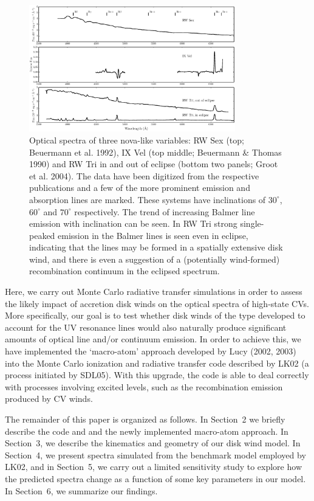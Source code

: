 \documentclass[preprint, a4paper, 11pt]{aastex}
\begin{document}
\begin{figure}	%
\centering
\includegraphics[width=0.8\textwidth]{figures/fig1.eps}
\caption{Optical spectra of three nova-like variables: 
RW Sex (top; Beuermann et al. 1992),
IX Vel (top middle; Beuermann \& Thomas 1990) 
and RW Tri in and out of eclipse (bottom two panels; Groot et al. 2004).
The data have been digitized from the respective publications and a few of the more
prominent emission and absorption lines are marked. 
These systems have inclinations of $30^\circ$, $60^\circ$ and $70^\circ$ 
respectively.
The trend of increasing Balmer line emission with inclination can be seen.
In RW Tri strong single-peaked emission in the Balmer lines is seen even
in eclipse, indicating that the lines may be formed in a spatially
extensive disk wind, and there is even a suggestion 
of a (potentially wind-formed) recombination continuum in the eclipsed
spectrum.}
\label{novalikes}
\end{figure}

\nocite{groot2004}
\nocite{beuermann1990}
\nocite{beuermann1992}

Here, we carry out Monte Carlo radiative transfer simulations in
order to assess the likely impact of accretion disk winds on the
optical spectra of high-state CVs. More specifically, our goal is to
test whether disk winds of the type developed to account for the UV
resonance lines would also naturally produce significant amounts of  
optical line and/or continuum emission. In order to achieve this, we
have implemented the `macro-atom' approach developed by Lucy
(2002, 2003) into the Monte Carlo ionization and radiative transfer
code described by LK02 (a process initiated by SDL05). With this
upgrade, the code is able to deal correctly with processes involving
excited levels, such as the recombination emission produced by CV
winds. 

The remainder of this paper is organized as follows. In Section~2 we
briefly describe the code and and the newly implemented macro-atom
approach. In Section~3, we describe the kinematics and geometry of our
disk wind model. 
In Section~4, we present spectra simulated from the benchmark model
employed by LK02, and in Section~5, we carry out a limited sensitivity
study to explore how the predicted spectra change as a function of
some key parameters in our model. In Section~6, we summarize our
findings.
\end{document}
